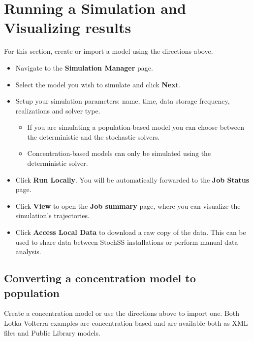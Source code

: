 \section{Running a Simulation and Visualizing results}

For this section, create or import a model using the directions above.

\begin{itemize}
  \item Navigate to the \textbf{Simulation Manager} page.
  \item Select the model you wish to simulate and click \textbf{Next}.
  \item Setup your simulation parameters: name, time, data storage frequency, realizations and solver type. 
  \begin{itemize}
    \item If you are simulating a population-based model you can choose between the deterministic and the stochastic solvers.
    \item Concentration-based models can only be simulated using the deterministic solver.
  \end{itemize}  
  \item Click \textbf{Run Locally}. You will be automatically forwarded to the \textbf{Job Status} page.%
  \item Click \textbf{View} to open the \textbf{Job summary} page, where you can visualize the simulation's trajectories.
  \item Click \textbf{Access Local Data} to download a raw copy of the data. This can be used to share data between StochSS installations or perform manual data analysis.
\end{itemize}

\subsection{Converting a concentration model to population}
Create a concentration model or use the directions above to import one. Both Lotka-Volterra examples are concentration based and are available both as XML files and Public Library models.

